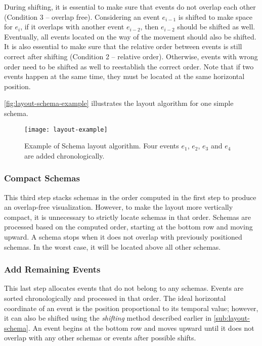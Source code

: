 During shifting, it is essential to make sure that events do not overlap each other (Condition 3 -- overlap free). Considering an event $e_{i-1}$ is shifted to make space for $e_i$, if it overlaps with another event $e_{i-2}$, then $e_{i-2}$ should be shifted as well. Eventually, all events located on the way of the movement should also be shifted. It is also essential to make sure that the relative order between events is still correct after shifting (Condition 2 -- relative order). Otherwise, events with wrong order need to be shifted as well to reestablish the correct order. Note that if two events happen at the same time, they must be located at the same horizontal position.

\autoref{fig:layout-schema-example} illustrates the layout algorithm for one simple schema.

\begin{figure}
	\centering
	\texttt{[image: layout-example]}
	\caption[Example of Schema layout algorithm]{Example of Schema layout algorithm. Four events $e_1$, $e_2$, $e_3$ and $e_4$ are added chronologically.}
	\label{fig:layout-schema-example}
\end{figure}

\subsubsection{Compact Schemas}
This third step stacks schemas in the order computed in the first step to produce an overlap-free visualization. However, to make the layout more vertically compact, it is unnecessary to strictly locate schemas in that order. Schemas are processed based on the computed order, starting at the bottom row and moving upward. A schema stops when it does not overlap with previously positioned schemas. In the worst case, it will be located above all other schemas.

\subsubsection{Add Remaining Events}
This last step allocates events that do not belong to any schemas. Events are sorted chronologically and processed in that order. The ideal horizontal coordinate of an event is the position proportional to its temporal value; however, it can also be shifted using the \emph{shifting} method described earlier in \autoref{sub:layout-schema}. An event begins at the bottom row and moves upward until it does not overlap with any other schemas or events after possible shifts.

